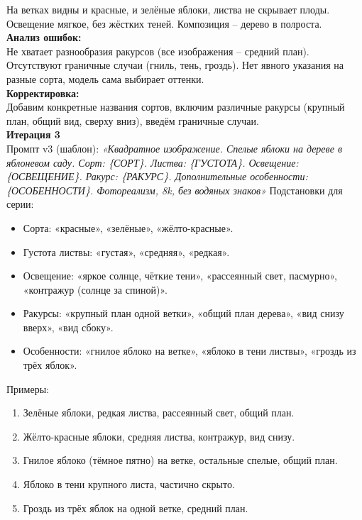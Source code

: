 На ветках видны и красные, и зелёные яблоки, листва не скрывает плоды. Освещение мягкое, без жёстких теней. Композиция – дерево в полроста. \\
\newline
\indent \textbf{Анализ ошибок:} \\
Не хватает разнообразия ракурсов (все изображения – средний план).
Отсутствуют граничные случаи (гниль, тень, гроздь).
Нет явного указания на разные сорта, модель сама выбирает оттенки. \\
\indent \textbf{Корректировка:} \\
Добавим конкретные названия сортов, включим различные ракурсы (крупный план, общий вид, сверху вниз), введём граничные случаи. \\
\newline
\indent \textbf{Итерация 3} \\
Промпт v3 (шаблон): 
\textit{«Квадратное изображение. Спелые яблоки на дереве в яблоневом саду. Сорт: \{СОРТ\}. Листва: \{ГУСТОТА\}. Освещение: \{ОСВЕЩЕНИЕ\}. Ракурс: \{РАКУРС\}. Дополнительные особенности: \{ОСОБЕННОСТИ\}. Фотореализм, 8k, без водяных знаков»}
\newpage
\noindent
Подстановки для серии:
\begin{itemize}
	\item Сорта: «красные», «зелёные», «жёлто-красные».
	\item Густота листвы: «густая», «средняя», «редкая».
	\item Освещение: «яркое солнце, чёткие тени», «рассеянный свет, пасмурно», «контражур (солнце за спиной)».
	\item Ракурсы: «крупный план одной ветки», «общий план дерева», «вид снизу вверх», «вид сбоку».
	\item Особенности: «гнилое яблоко на ветке», «яблоко в тени листвы», «гроздь из трёх яблок».
\end{itemize}
\noindent
\newline
Примеры:
\begin{enumerate}
	\item Зелёные яблоки, редкая листва, рассеянный свет, общий план.
	\item Жёлто-красные яблоки, средняя листва, контражур, вид снизу.
	\item Гнилое яблоко (тёмное пятно) на ветке, остальные спелые, общий план.
	\item Яблоко в тени крупного листа, частично скрыто.
	\item Гроздь из трёх яблок на одной ветке, средний план.
\end{enumerate}
\newpage
